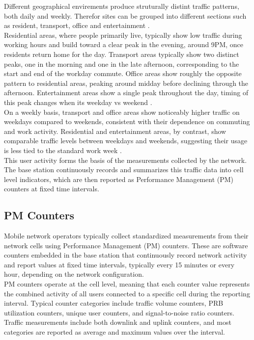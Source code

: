 Different geographical envirements produce struturally distint traffic patterns, both daily and weekly. Therefor sites can be grouped into different sections such as resident, transport, office and entertainment \cite{wang2015understanding}. \\

Residential areas, where people primarily live, typically show low traffic during working hours and build toward a clear peak in the evening, around 9PM, once residents return home for the day. Transport areas typically show two distinct peaks, one in the morning and one in the late afternoon, corresponding to the start and end of the workday commute. Office areas show roughly the opposite pattern to residential areas, peaking around midday before declining through the afternoon. Entertainment areas show a single peak throughout the day, timing of this peak changes when its weekday vs weekend \cite{wang2015understanding}. \\

On a weekly basis, transport and office areas show noticeably higher traffic on weekdays compared to weekends, consistent with their dependence on commuting and work activity. Residential and entertainment areas, by contrast, show comparable traffic levels between weekdays and weekends, suggesting their usage is less tied to the standard work week \cite{wang2015understanding}. \\

This user activity forms the basis of the measurements collected by the network. The base station continuously records and summarizes this traffic data into cell level indicators, which are then reported as Performance Management (PM) counters at fixed time intervals. \\


\subsection{PM Counters}
Mobile network operators typically collect standardized measurements from their network cells using Performance Management (PM) counters. These are software counters embedded in the base station that continuously record network activity and report values at fixed time intervals, typically every 15 minutes or every hour, depending on the network configuration. \\

PM counters operate at the cell level, meaning that each counter value represents the combined activity of all users connected to a specific cell during the reporting interval. Typical counter categories include traffic volume counters, PRB utilization counters, unique user counters, and signal-to-noise ratio counters. Traffic measurements include both downlink and uplink counters, and most categories are reported as average and maximum values over the interval. \\

